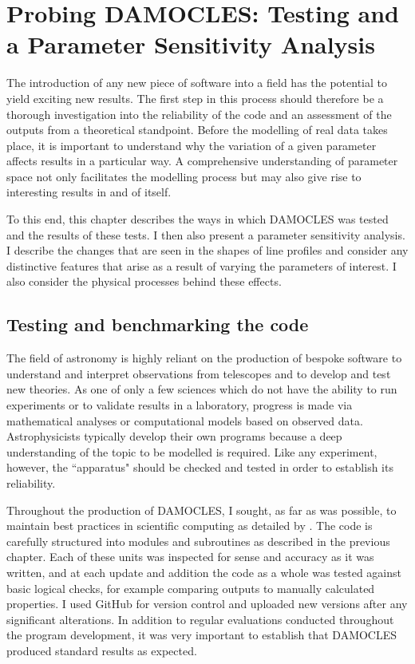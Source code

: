 

%
%
\chapter{Probing DAMOCLES:  Testing and a Parameter Sensitivity Analysis}\label{chp:chp4}

The introduction of any new piece of software into a field has the potential to yield exciting new results.  The first step in this process should therefore be a thorough investigation into the reliability of the code and an assessment of the outputs from a theoretical standpoint.  Before the modelling of real data takes place, it is important to understand why the variation of a  given parameter affects results in a particular way.  A comprehensive understanding of parameter space not only facilitates the modelling process but may also give rise to interesting results in and of itself.

To this end, this chapter describes the ways in which DAMOCLES was tested and the results of these tests.  I then also present a parameter sensitivity analysis.  I describe the changes that are seen in the shapes of line profiles and consider any distinctive features that arise as a result of varying the parameters of interest.  I also consider the physical processes behind these effects.


\section{Testing and benchmarking the code}

The field of astronomy is highly reliant on the production of bespoke software to understand and interpret observations from telescopes and to develop and test new theories.  As one of only a few sciences which do not have the ability to run experiments or to validate results in a laboratory, progress is made via mathematical analyses or computational models based on observed data.  Astrophysicists typically develop their own programs because a deep understanding of the topic to be modelled is required.  Like any experiment, however, the ``apparatus" should be checked and tested in order to establish its reliability.

Throughout the production of DAMOCLES, I sought, as far as was possible, to maintain best practices in scientific computing as detailed by \citet{Wilson2012}.  The code is carefully structured into modules and subroutines as described in the previous chapter.  Each of these units was inspected for sense and accuracy as it was written, and at each update and addition the code as a whole was tested against basic logical checks, for example comparing outputs to manually calculated properties.  I used GitHub for version control and uploaded new versions after any significant alterations.  In addition to regular evaluations conducted throughout the program development, it was very important to establish that DAMOCLES produced standard results as expected.

